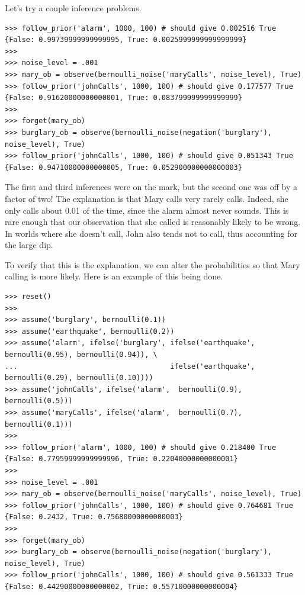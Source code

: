 \documentclass[11pt]{article}
\begin{document}
\noindent Let's try a couple inference problems.

\begin{small}
\begin{verbatim}
>>> follow_prior('alarm', 1000, 100) # should give 0.002516 True
{False: 0.99739999999999995, True: 0.0025999999999999999}
>>>
>>> noise_level = .001
>>> mary_ob = observe(bernoulli_noise('maryCalls', noise_level), True)
>>> follow_prior('johnCalls', 1000, 100) # should give 0.177577 True
{False: 0.91620000000000001, True: 0.083799999999999999}
>>>
>>> forget(mary_ob)
>>> burglary_ob = observe(bernoulli_noise(negation('burglary'), noise_level), True)
>>> follow_prior('johnCalls', 1000, 100) # should give 0.051343 True
{False: 0.94710000000000005, True: 0.052900000000000003}
\end{verbatim}
\end{small}

The first and third inferences were on the mark, but the second one was off by a factor of two!   The explanation is that Mary calls very rarely calls.  Indeed, she only calls about 0.01 of the time, since the alarm almost never sounds.  This is rare enough that our observation that she called is reasonably likely to be wrong.  In worlds where she doesn't call, John also tends not to call, thus accounting for the large dip. \vspace{6 pt}

To verify that this is the explanation, we can alter the probabilities so that Mary calling is more likely.  Here is an example of this being done.

\begin{small}
\begin{verbatim}
>>> reset()
>>>
>>> assume('burglary', bernoulli(0.1))
>>> assume('earthquake', bernoulli(0.2))
>>> assume('alarm', ifelse('burglary', ifelse('earthquake', bernoulli(0.95), bernoulli(0.94)), \
...                                    ifelse('earthquake', bernoulli(0.29), bernoulli(0.10))))
>>> assume('johnCalls', ifelse('alarm',  bernoulli(0.9), bernoulli(0.5)))
>>> assume('maryCalls', ifelse('alarm',  bernoulli(0.7), bernoulli(0.1)))
>>>
>>> follow_prior('alarm', 1000, 100) # should give 0.218400 True
{False: 0.77959999999999996, True: 0.22040000000000001}
>>>
>>> noise_level = .001
>>> mary_ob = observe(bernoulli_noise('maryCalls', noise_level), True)
>>> follow_prior('johnCalls', 1000, 100) # should give 0.764681 True
{False: 0.2432, True: 0.75680000000000003}
>>>
>>> forget(mary_ob)
>>> burglary_ob = observe(bernoulli_noise(negation('burglary'), noise_level), True)
>>> follow_prior('johnCalls', 1000, 100) # should give 0.561333 True
{False: 0.44290000000000002, True: 0.55710000000000004}
\end{verbatim}
\end{small}
\end{document}

